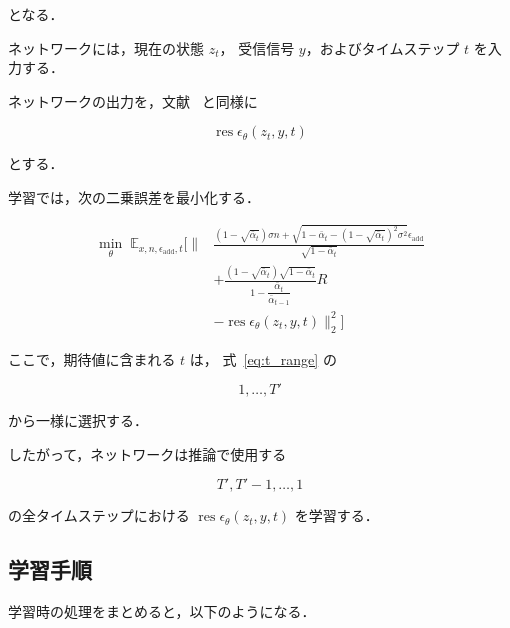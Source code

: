 \documentclass[a4paper,10pt,twocolumn]{ltjsarticle}
\begin{document}
となる．

ネットワークには，現在の状態 $z_t$，
受信信号 $y$，およびタイムステップ $t$ を入力する．

ネットワークの出力を，文献~\cite{resfusion} と同様に

\begin{equation}
\operatorname{res}\epsilon_{\theta}(z_t,y,t)
\label{eq:network_output}
\end{equation}

とする．

学習では，次の二乗誤差を最小化する．

\begin{equation}
\boxed{
\begin{aligned}
\min_{\theta}\;
\mathbb{E}_{x,n,\epsilon_{\mathrm{add}},t}
\Bigg[
\Bigg\|
&
\frac{
\left(
1-\sqrt{\bar{\alpha}_t}
\right)
\sigma n
+
\sqrt{
1-\bar{\alpha}_t
-
\left(
1-\sqrt{\bar{\alpha}_t}
\right)^2
\sigma^2
}
\epsilon_{\mathrm{add}}
}{
\sqrt{1-\bar{\alpha}_t}
}
\\
&+
\frac{
\left(
1-\sqrt{\bar{\alpha}_t}
\right)
\sqrt{1-\bar{\alpha}_t}
}{
1-
\dfrac{
\bar{\alpha}_t
}{
\bar{\alpha}_{t-1}
}
}
R
\\
&-
\operatorname{res}\epsilon_{\theta}(z_t,y,t)
\Bigg\|_2^2
\Bigg]
\end{aligned}
}
\label{eq:training_objective}
\end{equation}

ここで，期待値に含まれる $t$ は，
式~\eqref{eq:t_range} の

\[
1,\ldots,T'
\]

から一様に選択する．

したがって，ネットワークは推論で使用する

\[
T',T'-1,\ldots,1
\]

の全タイムステップにおける
$\operatorname{res}\epsilon_{\theta}(z_t,y,t)$
を学習する．

\subsection{学習手順}

学習時の処理をまとめると，以下のようになる．
\end{document}
